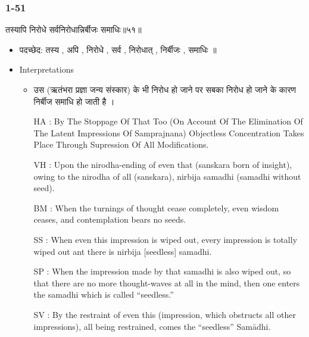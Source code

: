\begin{frame}[fragile]\frametitle{1-51}
\begin{sanskrit}
तस्यापि निरोधे सर्वनिरोधान्निर्बीजः समाधिः॥५१॥
\end{sanskrit}

	\begin{itemize}
	\item पदच्छेद: तस्य , अपि , निरोधे , सर्व , निरोधात् , निर्बीजः , समाधिः ॥
	\item Interpretations
		\begin{itemize}
		\item उस (ऋतंभरा प्रज्ञा जन्य संस्कार) के भी निरोध हो जाने पर सबका निरोध हो जाने के कारण निर्बीज समाधि हो जाती है ।
		\item [HA]: By The Stoppage Of That Too (On Account Of The Elimination Of The Latent Impressions Of Samprajnana) Objectless Concentration Takes Place Through Supression Of All Modifications.
		\item [VH]: Upon the nirodha-ending of even that (sanskara born of insight), owing to the nirodha of all (sanskara), nirbija samadhi (samadhi without seed).
		\item [BM]: When the turnings of thought cease completely, even wisdom ceases, and contemplation bears no seeds.
		\item [SS]: When even this impression is wiped out, every impression is totally wiped out ant there is nirbija [seedless] samadhi.
		\item [SP]: When the impression made by that samadhi is also wiped out, so that there are no more thought-waves at all in the mind, then one enters the samadhi which is called “seedless.”
		\item [SV]: By the restraint of even this (impression, which obstructs all other impressions), all being restrained, comes the “seedless” Samādhi. 
		\end{itemize}
	\end{itemize}
	
\end{frame}
